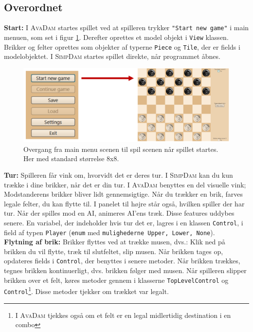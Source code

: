 \subsection{Overordnet}\label{sec:designOverordnet}
\textbf{Start:} I \textsc{AvaDam} startes spillet ved at spilleren trykker \texttt{"Start new game"} i main menuen, som set i figur \ref{fig:gameStart}. Derefter oprettes et model objekt i \texttt{View} klassen. Brikker og felter oprettes som objekter af typerne \texttt{Piece} og \texttt{Tile}, der er fields i modelobjektet. I \textsc{SimpDam} startes spillet direkte, når programmet åbnes.

    \begin{figure}[H]
        \centering
        \includegraphics[width = 0.7  \textwidth]{Figurer/gameStart}
        \caption{Overgang fra main menu scenen til spil scenen når spillet startes. Her med standard størrelse 8x8.}
        \label{fig:gameStart}
    \end{figure}

\textbf{Tur:} Spilleren får vink om, hvorvidt det er deres tur. I \textsc{SimpDam} kan du kun trække i dine brikker, når det er din tur. I \textsc{AvaDam} benyttes en del visuelle vink; Modstanderens brikker bliver lidt gennemsigtige. Når du trækker en brik, farves legale felter, du kan flytte til. I panelet til højre står også, hvilken spiller der har tur. Når der spilles mod en AI, animeres AI'ens træk. Disse features uddybes senere. En variabel, der indeholder hvis tur det er, lagres i en klassen \texttt{Control}, i field af typen \texttt{Player} (\texttt{enum} med \texttt{mulighederne Upper, Lower, None}).\\

\textbf{Flytning af brik:} Brikker flyttes ved at trække musen, dvs.: Klik ned på brikken du vil flytte, træk til slutfeltet, slip musen. Når brikken tages op, opdateres fields i \texttt{Control}, der benyttes i senere metoder. Når brikken trækkes, tegnes brikken kontinuerligt, dvs. brikken følger med musen. Når spilleren slipper brikken over et felt, køres metoder gennem i klasserne \texttt{TopLevelControl} og \texttt{Control}\footnote{I \textsc{AvaDam} tjekkes også om et felt er en legal midlertidig destination i en combo}. Disse metoder tjekker om trækket var legalt.
\\

